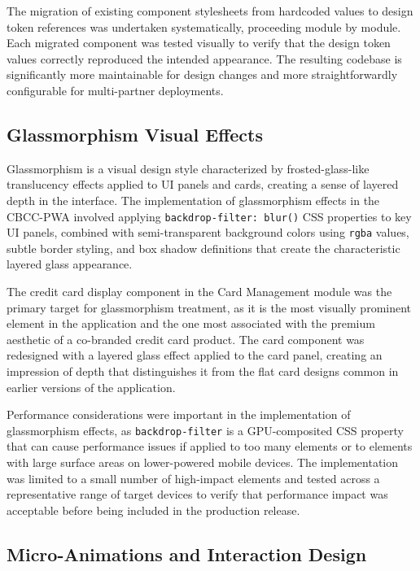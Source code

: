 The migration of existing component stylesheets from hardcoded values to design token references was undertaken systematically, proceeding module by module. Each migrated component was tested visually to verify that the design token values correctly reproduced the intended appearance. The resulting codebase is significantly more maintainable for design changes and more straightforwardly configurable for multi-partner deployments.

\subsection{Glassmorphism Visual Effects}

Glassmorphism is a visual design style characterized by frosted-glass-like translucency effects applied to UI panels and cards, creating a sense of layered depth in the interface. The implementation of glassmorphism effects in the CBCC-PWA involved applying \texttt{backdrop-filter: blur()} CSS properties to key UI panels, combined with semi-transparent background colors using \texttt{rgba} values, subtle border styling, and box shadow definitions that create the characteristic layered glass appearance.

The credit card display component in the Card Management module was the primary target for glassmorphism treatment, as it is the most visually prominent element in the application and the one most associated with the premium aesthetic of a co-branded credit card product. The card component was redesigned with a layered glass effect applied to the card panel, creating an impression of depth that distinguishes it from the flat card designs common in earlier versions of the application.

Performance considerations were important in the implementation of glassmorphism effects, as \texttt{backdrop-filter} is a GPU-composited CSS property that can cause performance issues if applied to too many elements or to elements with large surface areas on lower-powered mobile devices. The implementation was limited to a small number of high-impact elements and tested across a representative range of target devices to verify that performance impact was acceptable before being included in the production release.

\subsection{Micro-Animations and Interaction Design}

